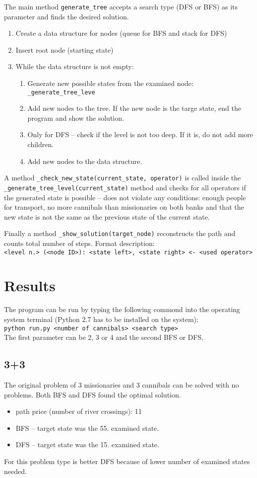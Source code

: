 \documentclass{article}
\begin{document}
 The main method \texttt{generate\_tree} accepts a search type (DFS or BFS) as its parameter and finds the desired solution. 
\begin{enumerate}
\item Create a data structure for nodes (queue for BFS and stack for DFS)
\item Insert root node (starting state)
\item While the data structure is not empty:
	\begin{enumerate}
	\item Generate new possible states from the examined node: \verb|_generate_tree_leve|
	\item Add new nodes to the tree. If the new node is the targe state, end the program and show the solution. 
	\item Only for DFS -- check if the level is not too deep. If it is, do not add more children.
	\item Add new nodes to the data structure. 
	\end{enumerate}
\end{enumerate}

A method \verb|_check_new_state(current_state, operator)| is called inside the \verb|_generate_tree_level(current_state)| method and checks for all operators if the generated state is possible -- does not violate any conditions: enough people for transport, no more cannibals than missionaries on both banks and that the new state is not the same as the previous state of the current state.

Finally a method \verb|_show_solution(target_node)| reconstructs the path and counts total number of steps. Format description: \\ \verb|<level n.> (<node ID>): <state left>, <state right> <- <used operator>|

\section{Results}
The program can be run by typing the following commond into the operating system terminal (Python 2.7 has to be installed on the system): \\ 
\verb|python run.py <number of cannibals> <search type>| 
\\ The first parameter can be 2, 3 or 4 and the second BFS or DFS.

\subsection{3+3}
The original problem of 3 missionaries and 3 cannibals can be solved with no problems. Both BFS and DFS found the optimal solution.
\begin{itemize}
\item path price (number of river crossings): 11
\item BFS -- target state was the 55. examined state.
\item DFS -- target state was the 15. examined state.
\end{itemize}
For this problem type is better DFS because of lower number of examined states needed.
\end{document}
